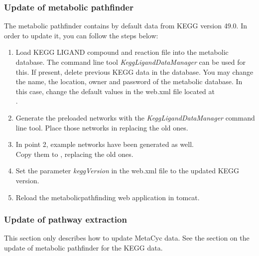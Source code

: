 \documentclass{book}
\begin{document}
\subsubsection{Update of metabolic pathfinder}
The metabolic pathfinder contains by default data from KEGG version 49.0.
In order to update it, you can follow the steps below:

\begin{enumerate}

\item Load KEGG LIGAND compound and reaction file into the metabolic database.
      The command line tool \textit{KeggLigandDataManager} can be used for this.
      If present, delete previous KEGG data in the database. You may change the name,
      the location, owner and password of the metabolic database. In this case, change the
      default values in the web.xml file located at\\
      .

\item Generate the preloaded networks with the \textit{KeggLigandDataManager} command line tool.
      Place those networks in  replacing the old ones.

\item In point 2, example networks have been generated as well.\\
      Copy them to
      , replacing the old ones.

\item Set the parameter \textit{keggVersion} in the web.xml file to the updated KEGG version.

\item Reload the metabolicpathfinding web application in tomcat.

\end{enumerate}

\subsubsection{Update of pathway extraction}

This section only describes how to update MetaCyc data.
See the section on the update of metabolic pathfinder for the KEGG data.
\end{document}
